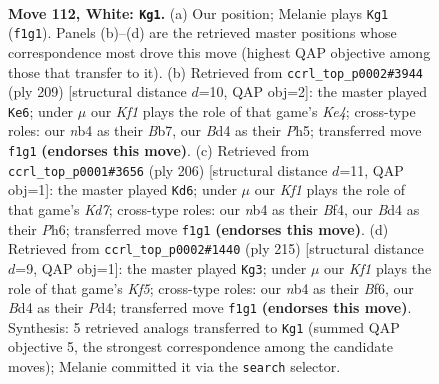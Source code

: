 \documentclass[11pt]{article}
\begin{document}
\clearpage

\begin{figure}[p]\centering
\begin{subfigure}{0.46\textwidth}\centering
\resizebox{\linewidth}{!}{%
\newchessgame
\chessboard[
  setfen={8/8/8/7k/1n1B4/5b2/5P2/5K2 w - - 69 112},
  showmover=false,
  pgfstyle=straightmove, color=movearrow, markmove={f1-g1}
]}
\caption{}
\end{subfigure}\hfill
\begin{subfigure}{0.46\textwidth}\centering
\resizebox{\linewidth}{!}{%
\newchessgame
\chessboard[
  setfen={8/1b6/8/4k2p/5p1B/8/5K2/8 b - - 57 105},
  showmover=false,
  pgfstyle=straightmove, color=movearrow, markmove={e5-e6}
]}
\caption{}
\end{subfigure}
\\[4pt]
\begin{subfigure}{0.46\textwidth}\centering
\resizebox{\linewidth}{!}{%
\newchessgame
\chessboard[
  setfen={8/3K1k2/7P/4P3/5B2/8/b7/8 w - - 13 104},
  showmover=false,
  pgfstyle=straightmove, color=movearrow, markmove={d7-d6}
]}
\caption{}
\end{subfigure}\hfill
\begin{subfigure}{0.46\textwidth}\centering
\resizebox{\linewidth}{!}{%
\newchessgame
\chessboard[
  setfen={8/1B6/5b2/8/3p1kp1/8/4K3/8 b - - 9 108},
  showmover=false,
  pgfstyle=straightmove, color=movearrow, markmove={f4-g3}
]}
\caption{}
\end{subfigure}
\caption{\textbf{Move 112, White: \texttt{Kg1}.} (a) Our position; Melanie plays \texttt{Kg1} (\texttt{f1g1}). Panels (b)--(d) are the retrieved master positions whose correspondence most drove this move (highest QAP objective among those that transfer to it). (b) Retrieved from \texttt{ccrl\_top\_p0002\#3944} (ply 209) [structural distance $d$=10, QAP obj=2]: the master played \texttt{Ke6}; under $\mu$ our \emph{Kf1} plays the role of that game's \emph{Ke4}; cross-type roles: our \emph{n}b4 as their \emph{B}b7, our \emph{B}d4 as their \emph{P}h5; transferred move \texttt{f1g1} \textbf{(endorses this move)}. (c) Retrieved from \texttt{ccrl\_top\_p0001\#3656} (ply 206) [structural distance $d$=11, QAP obj=1]: the master played \texttt{Kd6}; under $\mu$ our \emph{Kf1} plays the role of that game's \emph{Kd7}; cross-type roles: our \emph{n}b4 as their \emph{B}f4, our \emph{B}d4 as their \emph{P}h6; transferred move \texttt{f1g1} \textbf{(endorses this move)}. (d) Retrieved from \texttt{ccrl\_top\_p0002\#1440} (ply 215) [structural distance $d$=9, QAP obj=1]: the master played \texttt{Kg3}; under $\mu$ our \emph{Kf1} plays the role of that game's \emph{Kf5}; cross-type roles: our \emph{n}b4 as their \emph{B}f6, our \emph{B}d4 as their \emph{P}d4; transferred move \texttt{f1g1} \textbf{(endorses this move)}. Synthesis: 5 retrieved analogs transferred to \texttt{Kg1} (summed QAP objective 5, the strongest correspondence among the candidate moves); Melanie committed it via the \texttt{search} selector.}
\label{fig:thought-m222}
\end{figure}
\end{document}
